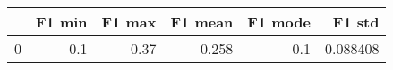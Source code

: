 \begin{tabular}{lrrrrr}
\toprule
{} &  F1 min &  F1 max &  F1 mean &  F1 mode &    F1 std \\
\midrule
0 &     0.1 &    0.37 &    0.258 &      0.1 &  0.088408 \\
\bottomrule
\end{tabular}
